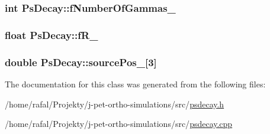 \subsubsection[{\texorpdfstring{f\+Number\+Of\+Gammas\+\_\+}{fNumberOfGammas_}}]{\setlength{\rightskip}{0pt plus 5cm}int Ps\+Decay\+::f\+Number\+Of\+Gammas\+\_\+\hspace{0.3cm}{\ttfamily [private]}}\hypertarget{classPsDecay_a7181fb08b4524a9f222bb5178e2b33b4}{}\label{classPsDecay_a7181fb08b4524a9f222bb5178e2b33b4}
\subsubsection[{\texorpdfstring{f\+R\+\_\+}{fR_}}]{\setlength{\rightskip}{0pt plus 5cm}float Ps\+Decay\+::f\+R\+\_\+\hspace{0.3cm}{\ttfamily [private]}}\hypertarget{classPsDecay_a905b6db3efeb23b273e90f2f3984ccd7}{}\label{classPsDecay_a905b6db3efeb23b273e90f2f3984ccd7}
\subsubsection[{\texorpdfstring{source\+Pos\+\_\+}{sourcePos_}}]{\setlength{\rightskip}{0pt plus 5cm}double Ps\+Decay\+::source\+Pos\+\_\+\mbox{[}3\mbox{]}\hspace{0.3cm}{\ttfamily [private]}}\hypertarget{classPsDecay_a66690e9b186fc10c3a494e9e5b2a138f}{}\label{classPsDecay_a66690e9b186fc10c3a494e9e5b2a138f}


The documentation for this class was generated from the following files\+:\begin{DoxyCompactItemize}
\item 
/home/rafal/\+Projekty/j-\/pet-\/ortho-\/simulations/src/\hyperlink{psdecay_8h}{psdecay.\+h}\item 
/home/rafal/\+Projekty/j-\/pet-\/ortho-\/simulations/src/\hyperlink{psdecay_8cpp}{psdecay.\+cpp}\end{DoxyCompactItemize}
